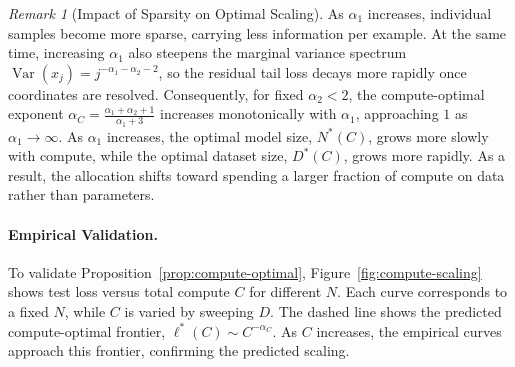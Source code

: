 \documentclass[11pt]{article}
\theoremstyle{plain}
\theoremstyle{definition}
\theoremstyle{remark}
\newtheorem{remark}[theorem]{Remark}
\newcommand{\JSCheck}[1]{#1}
\begin{document}
\begin{remark}[Impact of Sparsity on Optimal Scaling] 
\JSCheck{As $\alpha_1$ increases, individual samples become more sparse, carrying less information per example.  At the same time, increasing $\alpha_1$ also steepens the marginal variance spectrum $\operatorname{Var}(x_j)=j^{-\alpha_1-\alpha_2-2}$, so the residual tail loss decays more rapidly once coordinates are resolved. Consequently, for fixed \(\alpha_2<2\), the compute-optimal exponent $\alpha_C = \frac{\alpha_1 + \alpha_2 + 1}{\alpha_1 + 3}$ increases monotonically with $\alpha_1$, approaching $1$ as $\alpha_1 \to \infty$. As $\alpha_1$ increases, the optimal model size, $N^*(C)$, grows more slowly with compute, while the optimal dataset size, $D^*(C)$, grows more rapidly. As a result, the allocation shifts toward spending a larger fraction of compute on data rather than parameters.}
\end{remark}


\vspace{-3mm}

\paragraph{Empirical Validation.}
\JSCheck{To validate Proposition~\ref{prop:compute-optimal}, Figure~\ref{fig:compute-scaling} shows test loss versus total compute $C$ for different $N$. Each curve corresponds to a fixed $N$, while $C$ is varied by sweeping $D$. The dashed line shows the predicted compute-optimal frontier, $\ell^*(C)\sim C^{-\alpha_C}$. As $C$ increases, the empirical curves approach this frontier, confirming the predicted scaling.}
\end{document}
